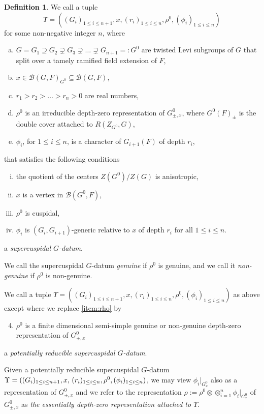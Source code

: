 \documentclass{article}
\newcommand{\cB}{\mathcal{B}}
\theoremstyle{definition}
\newtheorem{dfn}[thm]{Definition}
\numberwithin{equation}{subsection}
\renewcommand{\-}{\hyp{}}
\begin{document}
\begin{dfn}\label{dfn:supercuspidalGdatum} 
	We call a tuple 
\[\Upsilon= ((G_i)_{1\leq i\leq n+1},x,(r_i)_{1\leq i\leq n},\rho^0,(\phi_i)_{1\leq i\leq n}) \]
for some non-negative integer $n$, where  
\begin{enumerate}[(a)]
	\item $G=G_1 \supseteq G_2 \supsetneq G_3 \supsetneq \hdots \supsetneq G_{n+1}=:G^0$ are twisted Levi subgroups of $G$ that split over a tamely ramified field extension of $F$,
	\item  $x \in \cB(G,F)_{G^0} \subseteq \cB(G,F)$, 
	\item $r_1 > r_2 > \hdots > r_n >0$ are real numbers,
	\item \label{item:rho} $\rho^0$ is an irreducible depth-zero representation of $G^0_{\pm, x}$, where $G^0(F)_{\pm}$ is the double cover attached to $R(Z_{G^0}, G)$,
	\item $\phi_i$, for $1 \leq i \leq n$, is a character of $G_{i+1}(F)$ of depth $r_i$,
\end{enumerate}
that satisfies the following conditions 
\begin{enumerate}[(i)]
	\item  the quotient of the centers $Z(G^0)/Z(G)$ is anisotropic, 
	\item  $x$ is a vertex in $\cB(G^0,F)$,
	\item  $\rho^0$ is cuspidal,
	\item $\phi_i$ is $(G_i, G_{i+1})$-generic relative to $x$ of depth $r_i$ for all $1 \leq i \leq n$.
\end{enumerate}
a \emph{supercuspidal $G$-datum}.

We call the supercuspidal $G$-datum \emph{genuine} if $\rho^0$ is genuine, and we call it \emph{non-genuine} if $\rho^0$ is non-genuine.


We call a tuple \(\Upsilon= ((G_i)_{1\leq i\leq n+1},x,(r_i)_{1\leq i\leq n},\rho^0,(\phi_i)_{1\leq i\leq n}) \)
as above except where we replace \eqref{item:rho} by
\begin{enumerate}[(a')]
	\setcounter{enumi}{3}
	\item $\rho^0$ is a finite dimensional semi-simple genuine or non-genuine
	depth-zero representation of $G^0_{\pm, x}$
\end{enumerate}
a \emph{potentially reducible supercuspidal $G$-datum}.

Given a potentially reducible supercuspidal $G$-datum \(\Upsilon= ((G_i)_{1\leq i\leq n+1},x,$ $(r_i)_{1\leq i\leq n},\rho^0,(\phi_i)_{1\leq i\leq n}) \), we may view $\phi_i|_{G^0_x}$ also as a representation of $G^0_{\pm, x}$ and we refer to the representation $\rho:=\rho^0 \otimes \otimes_{i=1}^n \phi_i|_{G_x^0}$ of $G^0_{\pm,x}$ as \emph{the essentially depth-zero representation attached to $\Upsilon$}.
\end{dfn}
\end{document}
